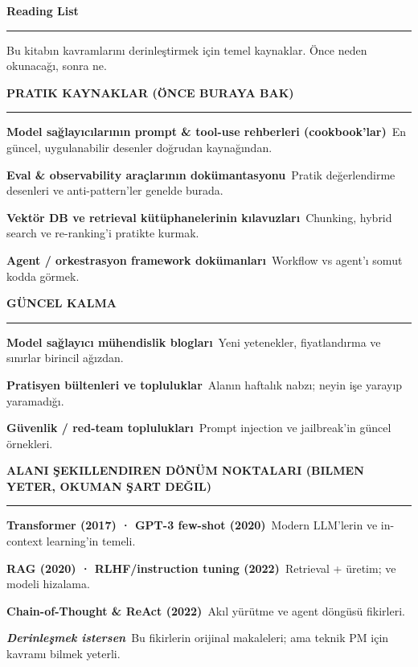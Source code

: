 \clearpage
{}
\noindent{}\par
\vspace{2pt}
{\sffamily\bfseries\fontsize{25}{28}\selectfont Reading List\par}
\vspace{2pt}\textcolor{accent}{\rule{34mm}{2pt}}\par
\vspace{2pt}
{\color{softgray}\small Bu kitabın kavramlarını derinleştirmek için temel kaynaklar. Önce neden okunacağı, sonra ne.}

\newcommand{\rg}[1]{\vspace{7pt}\par\noindent
  {\sffamily\bfseries\footnotesize\color{accentdk}\MakeUppercase{#1}}\par
  \vspace{-2pt}\textcolor{hairline}{\rule{\linewidth}{0.6pt}}\vspace{1pt}}
\newcommand{\rd}[2]{\par\vspace{2.5pt}\noindent\hangindent=6mm\hangafter=0
  \textbf{#1} \,{\scriptsize\color{softgray}#2}\par}

\rg{Pratik Kaynaklar (önce buraya bak)}
\rd{Model sağlayıcılarının prompt \& tool-use rehberleri (cookbook'lar)}{En güncel, uygulanabilir desenler doğrudan kaynağından.}
\rd{Eval \& observability araçlarının dokümantasyonu}{Pratik değerlendirme desenleri ve anti-pattern'ler genelde burada.}
\rd{Vektör DB ve retrieval kütüphanelerinin kılavuzları}{Chunking, hybrid search ve re-ranking'i pratikte kurmak.}
\rd{Agent / orkestrasyon framework dokümanları}{Workflow vs agent'ı somut kodda görmek.}

\rg{Güncel Kalma}
\rd{Model sağlayıcı mühendislik blogları}{Yeni yetenekler, fiyatlandırma ve sınırlar birincil ağızdan.}
\rd{Pratisyen bültenleri ve topluluklar}{Alanın haftalık nabzı; neyin işe yarayıp yaramadığı.}
\rd{Güvenlik / red-team toplulukları}{Prompt injection ve jailbreak'in güncel örnekleri.}

\rg{Alanı Şekillendiren Dönüm Noktaları (bilmen yeter, okuman şart değil)}
\rd{Transformer (2017) · GPT-3 few-shot (2020)}{Modern LLM'lerin ve in-context learning'in temeli.}
\rd{RAG (2020) · RLHF/instruction tuning (2022)}{Retrieval + üretim; ve modeli hizalama.}
\rd{Chain-of-Thought \& ReAct (2022)}{Akıl yürütme ve agent döngüsü fikirleri.}
\rd{\itshape Derinleşmek istersen}{Bu fikirlerin orijinal makaleleri; ama teknik PM için kavramı bilmek yeterli.}


